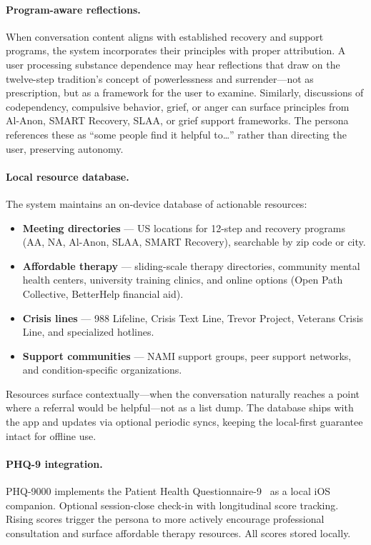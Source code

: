 \documentclass{article}
\begin{document}
\paragraph{Program-aware reflections.} When conversation content aligns with established recovery and support programs, the system incorporates their principles with proper attribution. A user processing substance dependence may hear reflections that draw on the twelve-step tradition's concept of powerlessness and surrender---not as prescription, but as a framework for the user to examine. Similarly, discussions of codependency, compulsive behavior, grief, or anger can surface principles from Al-Anon, SMART Recovery, SLAA, or grief support frameworks. The persona references these as ``some people find it helpful to\ldots'' rather than directing the user, preserving autonomy.

\paragraph{Local resource database.} The system maintains an on-device database of actionable resources:

\begin{itemize}
\item \textbf{Meeting directories} --- US locations for 12-step and recovery programs (AA, NA, Al-Anon, SLAA, SMART Recovery), searchable by zip code or city.
\item \textbf{Affordable therapy} --- sliding-scale therapy directories, community mental health centers, university training clinics, and online options (Open Path Collective, BetterHelp financial aid).
\item \textbf{Crisis lines} --- 988 Lifeline, Crisis Text Line, Trevor Project, Veterans Crisis Line, and specialized hotlines.
\item \textbf{Support communities} --- NAMI support groups, peer support networks, and condition-specific organizations.
\end{itemize}

Resources surface contextually---when the conversation naturally reaches a point where a referral would be helpful---not as a list dump. The database ships with the app and updates via optional periodic syncs, keeping the local-first guarantee intact for offline use.

\paragraph{PHQ-9 integration.} PHQ-9000 implements the Patient Health Questionnaire-9~\citep{kroenke2001phq9} as a local iOS companion. Optional session-close check-in with longitudinal score tracking. Rising scores trigger the persona to more actively encourage professional consultation and surface affordable therapy resources. All scores stored locally.
\end{document}

